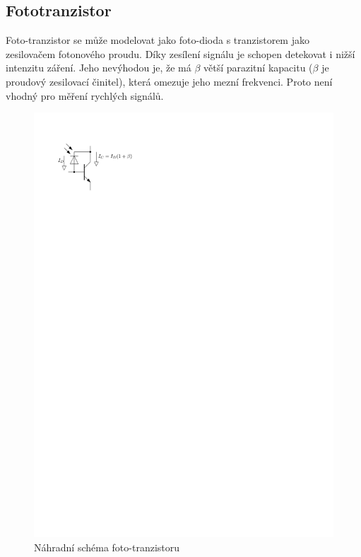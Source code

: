 \subsection{Fototranzistor}
Foto-tranzistor se může modelovat jako foto-dioda s tranzistorem jako zesilovačem fotonového proudu. Díky zesílení signálu je schopen detekovat i nižší intenzitu záření. Jeho nevýhodou je, že má $\beta$ větší parazitní kapacitu ($\beta$ je proudový zesilovací činitel), která omezuje jeho mezní frekvenci. Proto není vhodný pro měření rychlých signálů.

\begin{figure}[H]
    \begin{center}
        \includegraphics[scale=1]{img/foto-tran}
    \end{center}
    \caption{Náhradní schéma foto-tranzistoru}
\end{figure}

